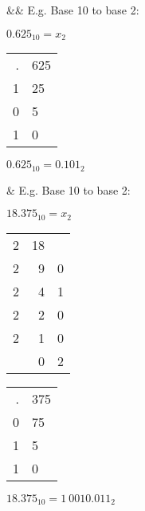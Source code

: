 \begin{easylist}[itemize]
	&& E.g. Base 10 to base 2:
	\Deactivate
	\begin{center}
		$0.625_{10} = x_{2}$
		
		\begin{table}[!htb]
			\centering
			\begin{tabular}{ r : l } %
				. & 625 \\
				1 & 25 \\
				0 & 5 \\
				1 & 0 \\
			\end{tabular}
		\end{table}
		
		$0.625_{10} = 0.101_{2}$
	\end{center}
	\Activate

& E.g. Base 10 to base 2:
\Deactivate
\begin{center}
	$18.375_{10} = x_{2}$
	
	\begin{table}[!htb]
		\begin{minipage}{.5\linewidth}
			\centering
			\begin{tabular}{ r | r l }
				            2 & 18 &   \\
				\cline{2-2} 2 &  9 & 0 \\
				\cline{2-2} 2 &  4 & 1 \\
				\cline{2-2} 2 &  2 & 0 \\
				\cline{2-2} 2 &  1 & 0 \\
				\cline{2-2} \multicolumn{2}{r}{0} & 2 \\
			\end{tabular}
		\end{minipage}%
		\begin{minipage}{.5\linewidth}
			\centering
			\begin{tabular}{ r : l }
				. & 375 \\
				0 & 75 \\
				1 & 5 \\
				1 & 0 \\
			\end{tabular}
		\end{minipage} 
	\end{table}

	$18.375_{10} = 1 \ 0010.011_{2}$
\end{center}
\Activate

\end{easylist}
